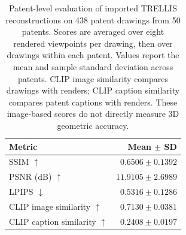\begin{table}[t]
\centering
\small
\caption{Patent-level evaluation of imported TRELLIS reconstructions on 438 patent drawings from 50 patents. Scores are averaged over eight rendered viewpoints per drawing, then over drawings within each patent. Values report the mean and sample standard deviation across patents. CLIP image similarity compares drawings with renders; CLIP caption similarity compares patent captions with renders. These image-based scores do not directly measure 3D geometric accuracy.}
\label{tab:trellis-patent-evaluation}
\begin{tabular*}{\columnwidth}{@{\extracolsep{\fill}}lr@{}}
\toprule
Metric & Mean $\pm$ SD \\
\midrule
SSIM $\uparrow$ & $0.6506 \pm 0.1392$ \\
PSNR (dB) $\uparrow$ & $11.9105 \pm 2.6989$ \\
LPIPS $\downarrow$ & $0.5316 \pm 0.1286$ \\
CLIP image similarity $\uparrow$ & $0.7130 \pm 0.0381$ \\
CLIP caption similarity $\uparrow$ & $0.2408 \pm 0.0197$ \\
\bottomrule
\end{tabular*}
\end{table}
